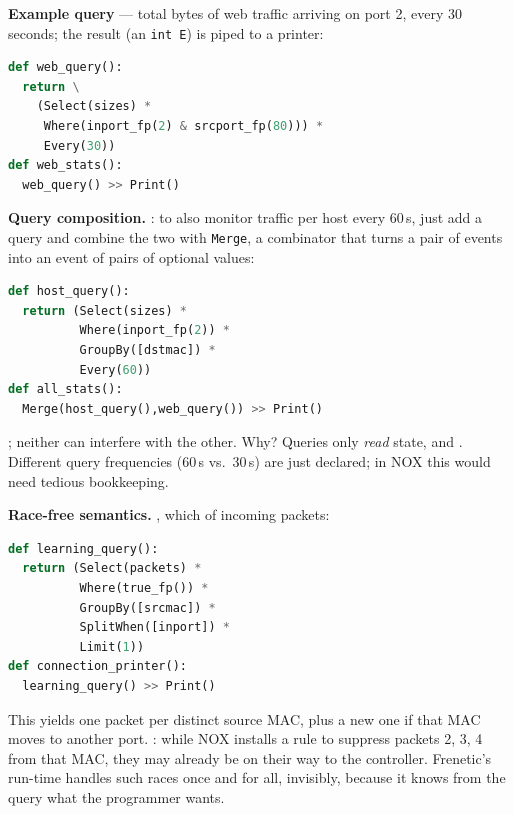 \textbf{Example query} --- total bytes of web traffic arriving on port 2, every 30 seconds; the result (an \texttt{int E}) is piped to a printer:
\begin{lstlisting}[language=Python]
def web_query():
  return \
    (Select(sizes) *
     Where(inport_fp(2) & srcport_fp(80))) *
     Every(30))
def web_stats():
  web_query() >> Print()
\end{lstlisting}

\textbf{Query composition.} : to also monitor traffic per host every 60\,s, just add a query and combine the two with \texttt{Merge}, a combinator that turns a pair of events into an event of pairs of optional values:
\begin{lstlisting}[language=Python]
def host_query():
  return (Select(sizes) *
          Where(inport_fp(2)) *
          GroupBy([dstmac]) *
          Every(60))
def all_stats():
  Merge(host_query(),web_query()) >> Print()
\end{lstlisting}
; neither can interfere with the other. Why? Queries only \emph{read} state, and . Different query frequencies (60\,s vs.\ 30\,s) are just declared; in NOX this would need tedious bookkeeping.

\textbf{Race-free semantics.} , which  of incoming packets:
\begin{lstlisting}[language=Python]
def learning_query():
  return (Select(packets) *
          Where(true_fp()) *
          GroupBy([srcmac]) *
          SplitWhen([inport]) *
          Limit(1))
def connection_printer():
  learning_query() >> Print()
\end{lstlisting}
This yields one packet per distinct source MAC, plus a new one if that MAC moves to another port. : while NOX installs a rule to suppress packets 2, 3, 4 from that MAC, they may already be on their way to the controller. Frenetic's run-time handles such races once and for all, invisibly, because it knows from the query what the programmer wants.

